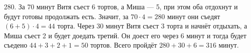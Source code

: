 280. За 70 минут Витя съест 6 тортов, а Миша --- 5, при этом оба отдохнут и будут готовы продолжать есть. Значит, за $70\cdot4=280$ минут они съедят $(6+5)\cdot4=44$ торта. Через 30 минут Витя съест 3 торта и начнёт отдыхать, а Миша съест 2 и будет доедать третий. Он доест его через 6 минут и тогда будет съедено $44+3+2+1=50$ тортов. Всего пройдёт $280+30+6=316$ минут.\\
